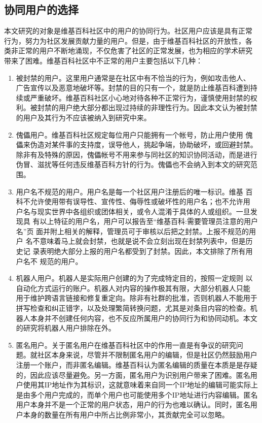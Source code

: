 \subsection{协同用户的选择}
\label{sec:user-exclude}

本文研究的对象是维基百科社区中的用户的协同行为。社区用户应该是具有正常
行为，努力为社区发展贡献力量的用户。但是，由于维基百科社区的开放性，各
类非正常的用户不断地涌现，不仅危害了社区的正常发展，也为相应的学术研究
带来了困难。维基百科社区中不正常的用户主要包括以下几种：
\begin{enumerate}
\item 被封禁的用户。这里用户通常是在社区中有不恰当的行为，例如攻击他人、
  广告宣传以及恶意地破坏等。封禁的目的只有一个，就是防止维基百科遭到持
  续或严重破坏。维基百科社区小心地对待各种不正常行为，谨慎使用封禁的权
  利。被封禁的用户绝大部分都出现过持续的非理性行为。因此本文认为被封禁
  的用户及其行为不应该被纳入到研究中来。
\item 傀儡用户。维基百科社区规定每位用户只能拥有一个帐号，防止用户使用
  傀儡来伪造对某件事的支持度，误导他人，挑起争端，协助破坏，或回避封禁。
  除非有及特殊的原因，傀儡帐号不用来参与同社区的知识协同活动，而是进行
  伪冒、滋扰等任何违反维基百科方针的行为。傀儡也不会纳入到本文的研究范
  围。
\item 用户名不规范的用户。用户名是每一个社区用户注册后的唯一标识。维基
  百科不允许使用带有误导性、宣传性、侮辱性或破坏性的用户名；也不允许用
  户名与现实世界中各组织或团体相关，或令人混淆于具体的人或组织。一旦发现具
  有以上特征的用户名，用户可以报告至“维基百科:需要管理员注意的用户名”页
  面并附上相关的解释，管理员可于审核以后把之封禁。上报不规范的用户
  名不意味着马上就会封禁，也就是说不会立刻出现在封禁列表中，但是历史记
  录表明绝大部分上报的用户名都受到了封禁。因此，本文排除了所有用户名不
  规范的用户。
\item 机器人用户。机器人是实际用户创建的为了完成特定目的，按照一定规则
  以自动化方式运行的账户。机器人对内容的操作极其有限，大部分机器人只能
  用于维护跨语言链接和修复重定向。除非有社群的批准，否则机器人不能用于
  拼写检查和纠正错字，以及处理繁简转换问题，尤其是对条目内容的检查。机
  器人本身并不创建任何内容，也不反应所属用户的协同行为和协同动机。本文
  的研究将机器人用户排除在外。
\item 匿名用户。关于匿名用户在维基百科社区中的作用一直是有争议的研究问
  题。就社区本身来说，尽管并不限制匿名用户的编辑，但是社区仍然鼓励用户
  注册一个账户，而非匿名编辑。维基百科认为匿名编辑的质量在本质是是存疑
  的，因此应该尽量避免。另一方面，匿名用户为识别用户带来了困难。匿名用
  户使用其IP地址作为其标识，这就意味着来自同一个IP地址的编辑可能实际上
  是由多个用户完成的，而单个用户也可能使用多个IP地址进行内容编辑。匿名
  用户本身并不是一个正常的用户状态，用户的行为也难以确认。同时，匿名用
  户本身的数量在所有用户中所占比例非常小，其贡献完全可以忽略。

\end{enumerate}

